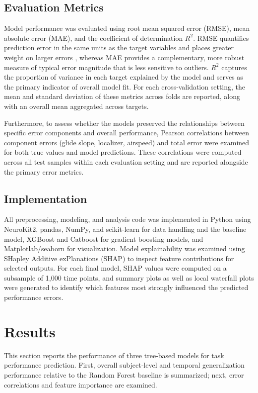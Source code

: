 \documentclass[11pt, a4paper]{article}
\begin{document}
\subsection{Evaluation Metrics}
Model performance was evaluated using root mean squared error (RMSE), mean absolute error (MAE), and the coefficient of determination $R^2$. RMSE quantifies prediction error in the same units as the target variables and places greater weight on larger errors \cite{barry-2025}, whereas MAE provides a complementary, more robust measure of typical error magnitude that is less sensitive to outliers. $R^2$ captures the proportion of variance in each target explained by the model and serves as the primary indicator of overall model fit. For each cross‑validation setting, the mean and standard deviation of these metrics across folds are reported, along with an overall mean aggregated across targets.

Furthermore, to assess whether the models preserved the relationships between specific error components and overall performance, Pearson correlations between component errors (glide slope, localizer, airspeed) and total error were examined for both true values and model predictions. These correlations were computed across all test samples within each evaluation setting and are reported alongside the primary error metrics.

\subsection{Implementation}
All preprocessing, modeling, and analysis code was implemented in Python using NeuroKit2, pandas, NumPy, and scikit-learn for data handling and the baseline model, XGBoost and Catboost for gradient boosting models, and Matplotlab/seaborn for visualization. Model explainability was examined using SHapley Additive exPlanations (SHAP) to inspect feature contributions for selected outputs. For each final model, SHAP values were computed on a subsample of 1,000 time points, and summary plots as well as local waterfall plots were generated to identify which features most strongly influenced the predicted performance errors.

\section{Results}\label{sec:results}
This section reports the performance of three tree‑based models for task performance prediction. First, overall subject‑level and temporal generalization performance relative to the Random Forest baseline is summarized; next, error correlations and feature importance are examined.
\end{document}

